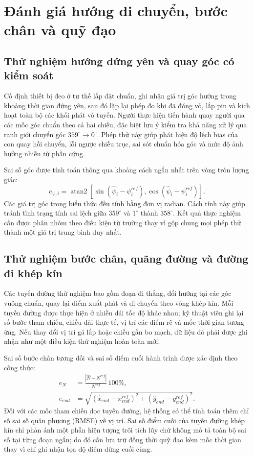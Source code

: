 \section{Đánh giá hướng di chuyển, bước chân và quỹ đạo}\label{sec:testpdr}
\subsection{Thử nghiệm hướng đứng yên và quay góc có kiểm soát}
Cố định thiết bị đeo ở tư thế lắp đặt chuẩn, ghi nhận giá trị góc hướng trong khoảng thời gian đứng yên, sau đó lặp lại phép đo khi đã đóng vỏ, lắp pin và kích hoạt toàn bộ các khối phát vô tuyến. Người thực hiện tiến hành quay người qua các mốc góc chuẩn theo cả hai chiều, đặc biệt lưu ý kiểm tra khả năng xử lý qua ranh giới chuyển góc $359^\circ \rightarrow 0^\circ$. Phép thử này giúp phát hiện độ lệch bias của con quay hồi chuyển, lỗi ngược chiều trục, sai sót chuẩn hóa góc và mức độ ảnh hưởng nhiễu từ phần cứng.

Sai số góc được tính toán thông qua khoảng cách ngắn nhất trên vòng tròn lượng giác:
\begin{equation}
e_{\psi,i}=\operatorname{atan2}\!\left[\sin(\hat\psi_i-\psi_i^{ref}),\cos(\hat\psi_i-\psi_i^{ref})\right].
\end{equation}
Các giá trị góc trong biểu thức đều tính bằng đơn vị radian. Cách tính này giúp tránh tình trạng tính sai lệch giữa $359^\circ$ và $1^\circ$ thành $358^\circ$. Kết quả thực nghiệm cần được phân nhóm theo điều kiện từ trường thay vì gộp chung mọi phép thử thành một giá trị trung bình duy nhất.

\subsection{Thử nghiệm bước chân, quãng đường và đường đi khép kín}
Các tuyến đường thử nghiệm bao gồm đoạn đi thẳng, đổi hướng tại các góc vuông chuẩn, quay lại điểm xuất phát và di chuyển theo vòng khép kín. Mỗi tuyến đường được thực hiện ở nhiều dải tốc độ khác nhau; kỹ thuật viên ghi lại số bước tham chiếu, chiều dài thực tế, vị trí các điểm rẽ và mốc thời gian tương ứng. Nếu thay đổi vị trí gá lắp hoặc chiều gắn bo mạch, dữ liệu đó phải được ghi nhận như một điều kiện thử nghiệm hoàn toàn mới.

Sai số bước chân tương đối và sai số điểm cuối hành trình được xác định theo công thức:
\begin{align}
e_N&=\frac{|\hat N-N^{ref}|}{N^{ref}}\,100\%,\\
e_{end}&=\sqrt{(\hat x_{end}-x_{end}^{ref})^2+(\hat y_{end}-y_{end}^{ref})^2}.
\end{align}
Đối với các mốc tham chiếu dọc tuyến đường, hệ thống có thể tính toán thêm chỉ số sai số quân phương (RMSE) về vị trí. Sai số điểm cuối của tuyến đường khép kín chỉ phản ánh một phần hiện tượng trôi tích lũy chứ không mô tả toàn bộ sai số tại từng đoạn ngắn; do đó cần lưu trữ đồng thời quỹ đạo kèm mốc thời gian thay vì chỉ ghi nhận tọa độ điểm dừng cuối cùng.

